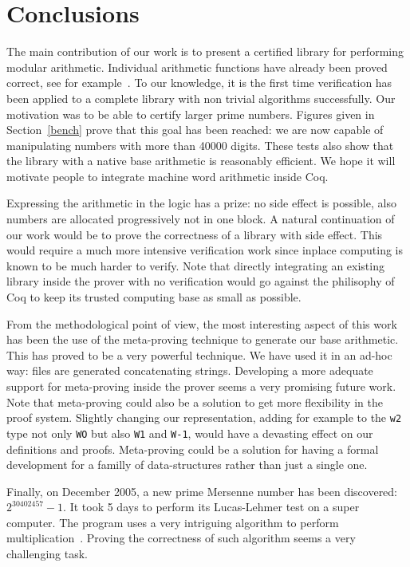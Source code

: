 \section{Conclusions}

The main contribution of our work is to present a certified library for performing
modular arithmetic. Individual arithmetic functions have already been proved correct,
see for example~\cite{BerMagZim02}. To our knowledge, it is the first time verification
has been applied to a complete library  with non trivial algorithms successfully.
Our motivation was to be able to certify  larger prime numbers. Figures given in Section~\ref{bench} 
prove that this goal has been reached: we are now capable of manipulating numbers with more than 40000 digits.
These tests also show that the library with a native base arithmetic is
reasonably efficient. We hope it will motivate people to integrate machine word arithmetic inside {\sc Coq}.

Expressing the arithmetic in the logic has a prize: no side effect is possible, 
also numbers are allocated progressively not in one block.
A natural continuation of our work would be to prove the correctness of a library with side effect.
This would require a much more intensive verification work since inplace computing
is known to be much harder to verify.
Note that directly integrating an existing library inside the prover with no verification
would go against the philisophy of {\sc Coq} to keep its trusted computing base as small
as possible.

From the methodological point of view, the most interesting aspect of this work
has been the use of the meta-proving technique to generate our base arithmetic. This has proved
to be a very powerful technique. We have used it in an ad-hoc way: files are generated concatenating
strings. Developing a more adequate support for meta-proving inside the prover seems a
very promising future work. Note that meta-proving could also be a solution to get more flexibility
in the proof system. Slightly changing our representation, adding for example to  the {\tt w2} type not only {\tt WO}
but also {\tt W1} and {\tt W-1}, would have a devasting effect on our definitions and proofs.
Meta-proving could be a solution for having a formal development for a familly of data-structures rather than
just a single one.

Finally, on December 2005, a new prime Mersenne number has been discovered: $2 ^{30402457} - 1$.
It took 5 days to  perform its Lucas-Lehmer test on a super computer. The program
uses a very intriguing algorithm to perform multiplication~\cite{crandall}. Proving the correctness of
such algorithm seems a very challenging task. 